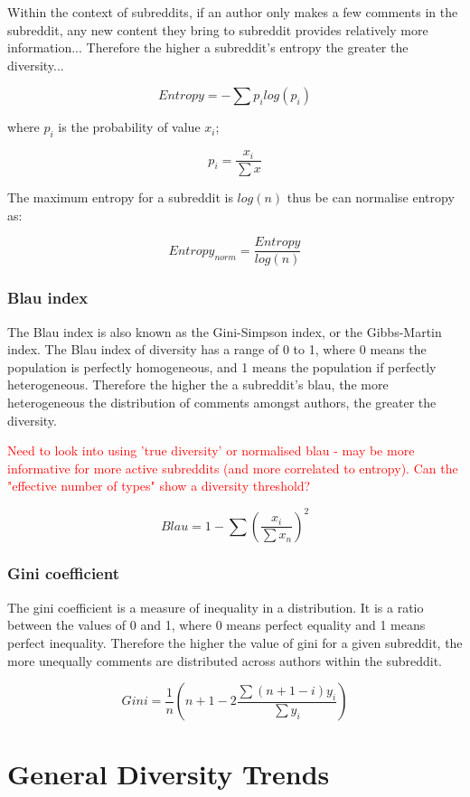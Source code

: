\documentclass{article}
\begin{document}
Within the context of subreddits, if an author only makes a few comments in the subreddit, any new content they bring to subreddit provides relatively more information... Therefore the higher a subreddit's entropy the greater the diversity...


$$Entropy = -\sum p_ilog(p_i)$$

where $p_i$ is the probability of value $x_i$;

$$p_i = \frac{x_i}{\sum x}$$

The maximum entropy for a subreddit is $log(n)$ thus be can normalise entropy as:

$$Entropy_{norm} = \frac{Entropy}{log(n)}$$

\subsubsection{Blau index} \label{blau index}

The Blau index is also known as the Gini-Simpson index, or the Gibbs-Martin index. The Blau index of diversity has a range of 0 to 1, where 0 means the population is perfectly homogeneous, and 1 means the population if perfectly heterogeneous. Therefore the higher the a subreddit's blau, the more heterogeneous the distribution of comments amongst authors, the greater the diversity.


\textcolor{red}{Need to look into using 'true diversity' or normalised blau - may be more informative for more active subreddits (and more correlated to entropy). Can the "effective number of types" show a diversity threshold?}

$$Blau = 1 - \sum (\frac{x_i}{\sum x_n})^{2}$$

\subsubsection{Gini coefficient} \label{gini}

The gini coefficient is a measure of inequality in a distribution. It is a ratio between the values of 0 and 1, where 0 means perfect equality and 1 means perfect inequality. Therefore the higher the value of gini for a given subreddit, the more unequally comments are distributed across authors within the subreddit.

$$Gini = \frac{1}{n}(n+1-2\frac{\sum(n+1-i)y_i}{\sum y_i})$$





\section{General Diversity Trends} \label{1.1}
\end{document}
